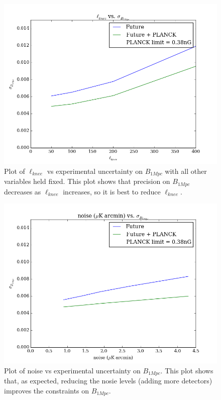 \begin{figure}[h]
\centering
\includegraphics[scale=0.8]{images/knee.png}
\caption{Plot of $\ell_{knee}$ vs experimental uncertainty on $B_{1Mpc}$ with all other variables held fixed. This plot shows that precision on $B_{1Mpc}$ decreases as $\ell_{knee}$ increases, so it is best to reduce $\ell_{knee}$.}
\label{fig:knee}
\end{figure}

\begin{figure}[h]
\centering
\includegraphics[scale=0.8]{images/noise.png}
\caption{Plot of noise vs experimental uncertainty on $B_{1Mpc}$. This plot shows that, as expected, reducing the nosie levels (adding more detectors) improves the constraints on $B_{1Mpc}$.}
\label{fig:noise}
\end{figure}

